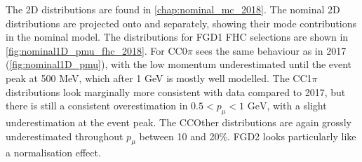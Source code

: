 The 2D \pmu \cosmu distributions are found in \autoref{chap:nominal_mc_2018}. The nominal 2D distributions are projected onto \pmu and \cosmu separately, showing their mode contributions in the nominal model. The distributions for FGD1 FHC \numu selections are shown in \autoref{fig:nominal1D_pmu_fhc_2018}. For CC0$\pi$ sees the same behaviour as in 2017 (\autoref{fig:nominal1D_pmu}), with the low momentum underestimated until the event peak at 500 MeV, which after 1 GeV is mostly well modelled. The CC1$\pi$ distributions look marginally more consistent with data compared to 2017, but there is still a consistent overestimation in $0.5 < p_\mu < 1\text{ GeV}$, with a slight underestimation at the event peak. The CCOther distributions are again grossly underestimated throughout $p_\mu$ between 10 and 20\%. FGD2 looks particularly like a normalisation effect.

